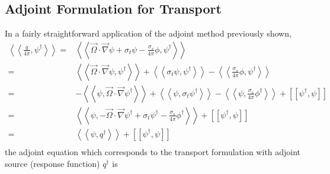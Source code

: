 \documentclass[12pt]{report}
\newcommand{\vO}{\vec{\Omega}}
\newcommand{\braSN}{\left\langle \! \left\langle}
\newcommand{\ketSN}{\right\rangle \! \right\rangle}
\newcommand{\sbraSN}{\left[ \! \left[}
\newcommand{\sketSN}{\right] \! \right]}
\newcommand{\grad}{\vec{\nabla}}
\newcommand{\sigt}{\sigma_t}
\newcommand{\sigs}{\sigma_s}
\newcommand{\angResp}{q^\dag}
\begin{document}
\subsection{Adjoint Formulation for Transport}
In a fairly straightforward application of the adjoint method previously shown, 
\begin{equation}
\label{SnAdjDeriv}
\begin{split}
\braSN \frac{q}{4 \pi} , \psi^\dag  \ketSN  
=& \braSN \vO \cdot \grad \psi + \sigt \psi - \frac{\sigs}{4 \pi} \phi, \psi^\dag \ketSN \\
=& \braSN \vO \cdot \grad \psi, \psi^\dag \ketSN  + \braSN \sigt \psi, \psi^\dag \ketSN  - \braSN \frac{\sigs}{4 \pi}  \phi, \psi^\dag \ketSN \\
=& - \braSN  \psi, \vO \cdot \grad \psi^\dag \ketSN  + \braSN \psi, \sigt \psi^\dag \ketSN  - \braSN   \psi, \frac{\sigs}{4 \pi} \phi^\dag \ketSN + \sbraSN \psi^\dag,  \psi \sketSN\\
=& \braSN  \psi,-  \vO \cdot \grad \psi^\dag  +  \sigt \psi^\dag -  \frac{\sigs}{4 \pi} \phi^\dag \ketSN + \sbraSN \psi^\dag,  \psi \sketSN\\
=& \braSN  \psi,q^\dag \ketSN + \sbraSN \psi^\dag,  \psi \sketSN\\
\end{split}
\end{equation}
the adjoint equation which corresponds to the transport formulation with adjoint source (response function)
$\angResp$ is
\end{document}
